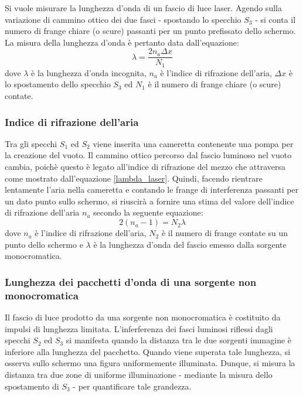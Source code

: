 \documentclass[]{article}
\begin{document}
Si vuole misurare la lunghezza d'onda di un fascio di luce laser. Agendo sulla variazione di cammino ottico dei due fasci - spostando lo specchio $S_3$ - si conta il numero di frange chiare (o scure) passanti per un punto prefissato dello schermo. La misura della lunghezza d'onda è pertanto data dall'equazione:
\begin{equation}
    \label{lambda_laser}
    \lambda = \frac{2 n_a \Delta x}{N_1}
\end{equation}
dove $\lambda$ è la lunghezza d'onda incognita, $n_a$ è l'indice di rifrazione dell'aria, $\Delta x$ è lo spostamento dello specchio $S_3$ ed $N_1$ è il numero di frange chiare (o scure) contate.

\subsubsection{Indice di rifrazione dell'aria}

Tra gli specchi $S_1$ ed $S_2$ viene inserita una cameretta contenente una pompa per la creazione del vuoto. Il cammino ottico percorso dal fascio luminoso nel vuoto cambia, poichè questo è legato all'indice di rifrazione del mezzo che attraversa come mostrato dall'equazione \ref{lambda_laser}. Quindi, facendo rientrare lentamente l'aria nella cameretta e contando le frange di interferenza passanti per un dato punto sullo schermo, si riuscirà a fornire una stima del valore dell'indice di rifrazione dell'aria $n_a$ secondo la seguente equazione:
\begin{equation}
    \label{n_a}
    2(n_a - 1) = N_2 \lambda
\end{equation}
dove $n_a$ è l'indice di rifrazione dell'aria, $N_2$ è il numero di frange contate su un punto dello schermo e $\lambda$ è la lunghezza d'onda del fascio emesso dalla sorgente monocromatica.

\subsubsection{Lunghezza dei pacchetti d'onda di una sorgente non monocromatica}
\label{par:123}

Il fascio di luce prodotto da una sorgente non monocromatica è costituito da impulsi di lunghezza limitata. L'inferferenza dei fasci luminosi riflessi dagli specchi $S_2$ ed $S_3$ si manifesta quando la distanza tra le due sorgenti immagine è inferiore alla lunghezza del pacchetto. Quando viene superata tale lunghezza, si osserva sullo schermo una figura uniformemente illuminata. Dunque, si misura la distanza tra due zone di uniforme illuminazione - mediante la misura dello spostamento di $S_3$ - per quantificare tale grandezza.
\end{document}
